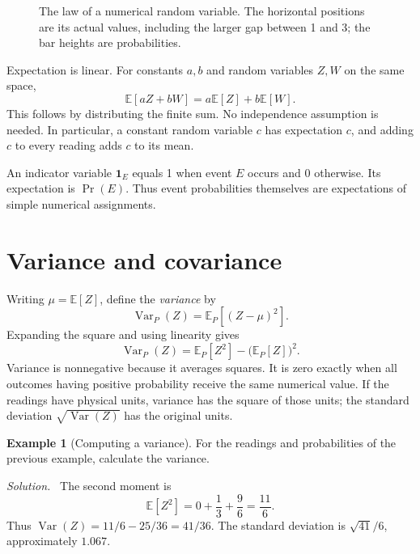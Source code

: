 \documentclass[11pt,oneside,openany]{book}
\theoremstyle{definition}
\newtheorem{example}{Example}[chapter]
\theoremstyle{remark}
\newenvironment{solution}{\par\smallskip\noindent\textit{Solution.}\ }{\par\smallskip}
\newcommand{\E}{\mathbb{E}}
\newcommand{\Var}{\operatorname{Var}}
\numberwithin{equation}{chapter}
\begin{document}
\begin{figure}[htbp]
\centering
{}
\caption{The law of a numerical random variable. The horizontal positions are its actual values, including the larger gap between 1 and 3; the bar heights are probabilities.}
\end{figure}

Expectation is linear. For constants $a,b$ and random variables $Z,W$ on the same space,
\[
\E[aZ+bW]=a\E[Z]+b\E[W].
\]
This follows by distributing the finite sum. No independence assumption is needed. In particular, a constant random variable $c$ has expectation $c$, and adding $c$ to every reading adds $c$ to its mean.

An indicator variable $\mathbf{1}_E$ equals 1 when event $E$ occurs and 0 otherwise. Its expectation is $\Pr(E)$. Thus event probabilities themselves are expectations of simple numerical assignments.

\section{Variance and covariance}
Writing $\mu=\E[Z]$, define the \emph{variance} by
\[
\Var_P(Z)=\E_P[(Z-\mu)^2].
\]
Expanding the square and using linearity gives
\begin{equation}\label{eq:variance}
\Var_P(Z)=\E_P[Z^2]-\bigl(\E_P[Z]\bigr)^2.
\end{equation}
Variance is nonnegative because it averages squares. It is zero exactly when all outcomes having positive probability receive the same numerical value. If the readings have physical units, variance has the square of those units; the standard deviation $\sqrt{\Var(Z)}$ has the original units.

\begin{example}[Computing a variance]
For the readings and probabilities of the previous example, calculate the variance.
\begin{solution}
The second moment is
\[
\E[Z^2]=0+\frac13+\frac{9}{6}=\frac{11}{6}.
\]
Thus $\Var(Z)=11/6-25/36=41/36$. The standard deviation is $\sqrt{41}/6$, approximately $1.067$.
\end{solution}
\end{example}
\end{document}
